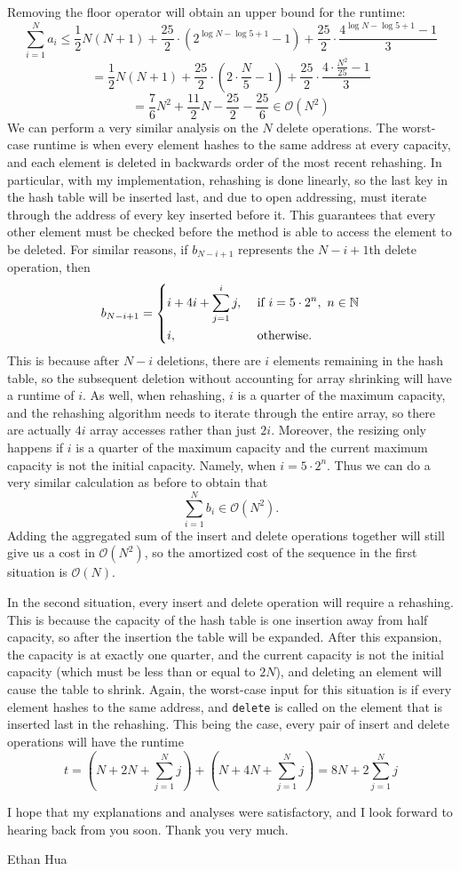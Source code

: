 \documentclass[11pt]{article}
\begin{document}
    Removing the floor operator will obtain an upper bound for the runtime:
    \[
        \sum_{i=1}^{N} a_i \leq \frac{1}{2}N(N+1)+\frac{25}{2} \cdot (2^{\log N - \log 5 + 1} - 1) + \frac{25}{2} \cdot \frac{4^{\log N - \log 5 + 1} - 1}{3}
    \]
    \[
        = \frac{1}{2}N(N+1)+\frac{25}{2} \cdot \left(2 \cdot \frac{N}{5} - 1\right) + \frac{25}{2} \cdot \frac{4 \cdot \frac{N^2}{25} - 1}{3}
    \]
    \[
        = \frac{7}{6}N^2 + \frac{11}{2}N - \frac{25}{2} - \frac{25}{6} \in \mathcal{O} (N^2)
    \]
    We can perform a very similar analysis on the \(N\) delete operations. The worst-case runtime is when every element hashes to the same address at every capacity, and each element is deleted in backwards order of the most recent rehashing. In particular, with my implementation, rehashing is done linearly, so the last key in the hash table will be inserted last, and due to open addressing, must iterate through the address of every key inserted before it. This guarantees that every other element must be checked before the method is able to access the element to be deleted. For similar reasons, if \(b_{N - i + 1}\) represents the \(N-i+1\)th delete operation, then
    \[
        b_{N-i+1} = \begin{dcases}
            i + 4i + \sum_{j=1}^{i} j, &\text{ if } i = 5 \cdot 2^{n}, \ n \in \mathbb{N}\\
            i, &\text{ otherwise} .
        \end{dcases}
    \]
    This is because after \(N-i\) deletions, there are \(i\) elements remaining in the hash table, so the subsequent deletion without accounting for array shrinking will have a runtime of \(i\). As well, when rehashing, \(i\) is a quarter of the maximum capacity, and the rehashing algorithm needs to iterate through the entire array, so there are actually \(4i\) array accesses rather than just \(2i\). Moreover, the resizing only happens if \(i\) is a quarter of the maximum capacity and the current maximum capacity is not the initial capacity. Namely, when \(i = 5 \cdot 2^n\). Thus we can do a very similar calculation as before to obtain that
    \[
        \sum_{i=1}^{N} b_i \in \mathcal{O} (N^2).
    \]
    Adding the aggregated sum of the insert and delete operations together will still give us a cost in \(\mathcal{O} (N^2)\), so the amortized cost of the sequence in the first situation is \(\mathcal{O} (N)\).

    In the second situation, every insert and delete operation will require a rehashing. This is because the capacity of the hash table is one insertion away from half capacity, so after the insertion the table will be expanded. After this expansion, the capacity is at exactly one quarter, and the current capacity is not the initial capacity (which must be less than or equal to \(2N\)), and deleting an element will cause the table to shrink. Again, the worst-case input for this situation is if every element hashes to the same address, and \texttt{delete} is called on the element that is inserted last in the rehashing. This being the case, every pair of insert and delete operations will have the runtime
    \[
        t = \left(N + 2N + \sum_{j=1}^{N} j\right) + \left( N + 4N + \sum_{j=1}^{N} j \right) = 8N + 2\sum_{j=1}^{N} j
    \] 
    
    I hope that my explanations and analyses were satisfactory, and I look forward to hearing back from you soon. Thank you very much.

    \medskip

    Ethan Hua
\end{document}
